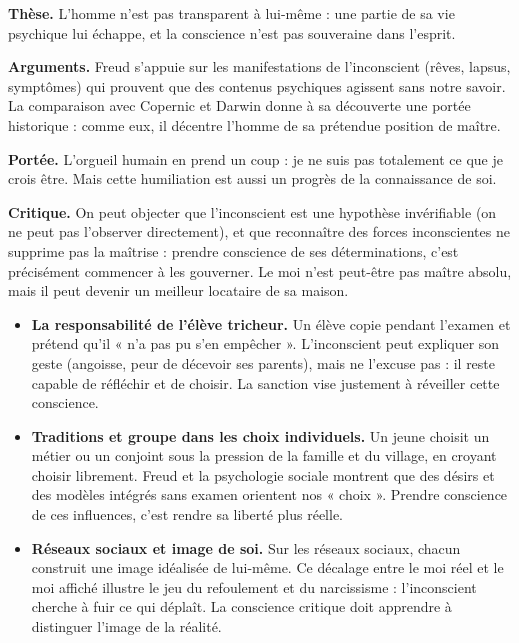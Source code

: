 \documentclass[11pt]{article}
\newcounter{popsec}
\newcounter{popsub}
\newcommand{\courssub}[1]{%
  \stepcounter{popsub}%
  \par\vspace{9pt}\noindent{\popxbold\fontsize{11.5}{13}\selectfont\color{popink}{\color{poporange}\thepopsec.\thepopsub}\hspace{6pt}#1}\par\nopagebreak\vspace{4pt}
}
\begin{document}
\textbf{Thèse.} L'homme n'est pas transparent à lui-même : une partie de sa vie psychique lui échappe, et la conscience n'est pas souveraine dans l'esprit.

\textbf{Arguments.} Freud s'appuie sur les manifestations de l'inconscient (rêves, lapsus, symptômes) qui prouvent que des contenus psychiques agissent sans notre savoir. La comparaison avec Copernic et Darwin donne à sa découverte une portée historique : comme eux, il décentre l'homme de sa prétendue position de maître.

\textbf{Portée.} L'orgueil humain en prend un coup : je ne suis pas totalement ce que je crois être. Mais cette humiliation est aussi un progrès de la connaissance de soi.

\textbf{Critique.} On peut objecter que l'inconscient est une hypothèse invérifiable (on ne peut pas l'observer directement), et que reconnaître des forces inconscientes ne supprime pas la maîtrise : prendre conscience de ses déterminations, c'est précisément commencer à les gouverner. Le moi n'est peut-être pas maître absolu, mais il peut devenir un meilleur locataire de sa maison.

\courssub{Application aux situations concrètes}

\begin{exemplebox}
\begin{itemize}
\item \textbf{La responsabilité de l'élève tricheur.} Un élève copie pendant l'examen et prétend qu'il « n'a pas pu s'en empêcher ». L'inconscient peut expliquer son geste (angoisse, peur de décevoir ses parents), mais ne l'excuse pas : il reste capable de réfléchir et de choisir. La sanction vise justement à réveiller cette conscience.
\item \textbf{Traditions et groupe dans les choix individuels.} Un jeune choisit un métier ou un conjoint sous la pression de la famille et du village, en croyant choisir librement. Freud et la psychologie sociale montrent que des désirs et des modèles intégrés sans examen orientent nos « choix ». Prendre conscience de ces influences, c'est rendre sa liberté plus réelle.
\item \textbf{Réseaux sociaux et image de soi.} Sur les réseaux sociaux, chacun construit une image idéalisée de lui-même. Ce décalage entre le moi réel et le moi affiché illustre le jeu du refoulement et du narcissisme : l'inconscient cherche à fuir ce qui déplaît. La conscience critique doit apprendre à distinguer l'image de la réalité.
\end{itemize}
\end{exemplebox}
\end{document}

